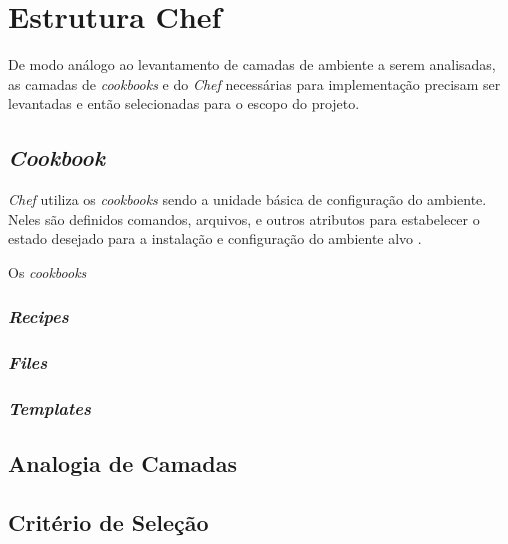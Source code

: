 \section{Estrutura Chef}
De modo análogo ao levantamento de camadas de ambiente a serem analisadas,
as camadas de \textit{cookbooks} e do \textit{Chef} necessárias para implementação precisam
ser levantadas e então selecionadas para o escopo do projeto.

\subsection{\textit{Cookbook}}

\textit{Chef} utiliza os \textit{cookbooks} sendo a unidade básica de configuração do
ambiente. Neles são definidos comandos, arquivos, e outros atributos
para estabelecer o estado desejado para a instalação e configuração
do ambiente alvo \cite{sharma:2015}.

Os \textit{cookbooks} 


\subsubsection{\textit{Recipes}}
\subsubsection{\textit{Files}}
\subsubsection{\textit{Templates}}

\subsection{Analogia de Camadas}

\subsection{Critério de Seleção}

